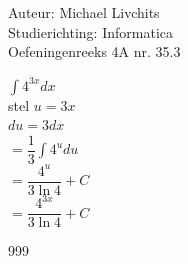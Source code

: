 \documentclass[a4paper]{article}
\begin{document}
  
\noindent \large Auteur: Michael Livchits \\
\noindent \large Studierichting: Informatica\\
\noindent \large Oefeningenreeks 4A nr. 35.3\\

\medskip

\normalsize

$\displaystyle\int 4^{3x}dx$\\

stel $u = 3x$\\

$du = 3dx$\\

$= \dfrac{1}{3}\displaystyle\int 4^udu$\\

$= \dfrac{4^u}{3\ln4} + C$\\

$= \dfrac{4^{3x}}{3\ln4} + C$\\

\begin{thebibliography}{999}
\end{thebibliography}
\end{document}
